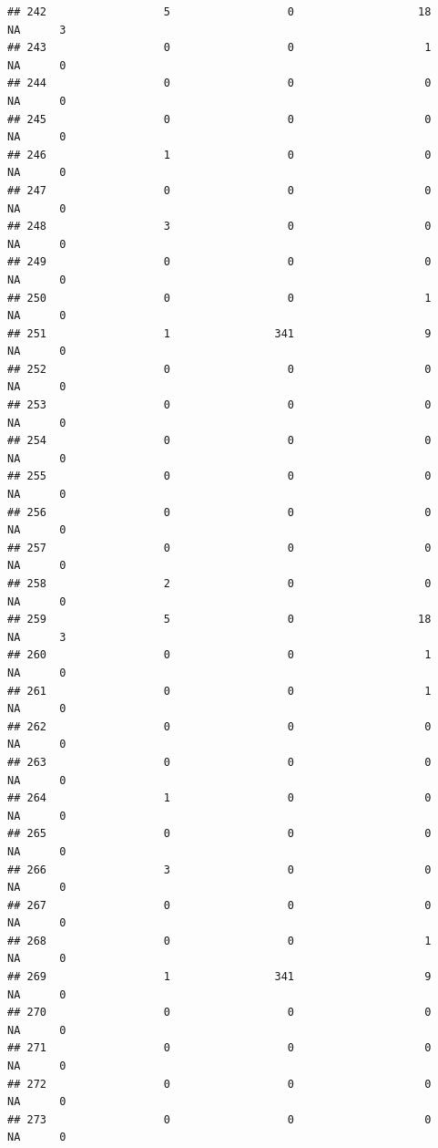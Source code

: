 \documentclass[
]{article}
\begin{document}
\begin{verbatim}
## 242                  5                  0                   18       NA      3
## 243                  0                  0                    1       NA      0
## 244                  0                  0                    0       NA      0
## 245                  0                  0                    0       NA      0
## 246                  1                  0                    0       NA      0
## 247                  0                  0                    0       NA      0
## 248                  3                  0                    0       NA      0
## 249                  0                  0                    0       NA      0
## 250                  0                  0                    1       NA      0
## 251                  1                341                    9       NA      0
## 252                  0                  0                    0       NA      0
## 253                  0                  0                    0       NA      0
## 254                  0                  0                    0       NA      0
## 255                  0                  0                    0       NA      0
## 256                  0                  0                    0       NA      0
## 257                  0                  0                    0       NA      0
## 258                  2                  0                    0       NA      0
## 259                  5                  0                   18       NA      3
## 260                  0                  0                    1       NA      0
## 261                  0                  0                    1       NA      0
## 262                  0                  0                    0       NA      0
## 263                  0                  0                    0       NA      0
## 264                  1                  0                    0       NA      0
## 265                  0                  0                    0       NA      0
## 266                  3                  0                    0       NA      0
## 267                  0                  0                    0       NA      0
## 268                  0                  0                    1       NA      0
## 269                  1                341                    9       NA      0
## 270                  0                  0                    0       NA      0
## 271                  0                  0                    0       NA      0
## 272                  0                  0                    0       NA      0
## 273                  0                  0                    0       NA      0

\end{verbatim}
\end{document}
